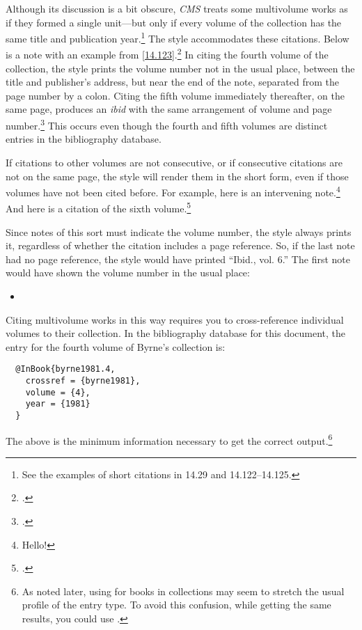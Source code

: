 \documentclass[11pt,letterpaper,oneside]{article}
\begin{document}
Although its discussion is a bit obscure, \textit{CMS} treats some
multivolume works as if they formed a single unit---but only if every
volume of the collection has the same title and publication
year.\footnote{See the examples of short citations in 14.29 and
14.122--14.125.} The style accommodates these citations. Below is a
note with an example from \ref{14.123}.\footcite[243]{byrne1981.4} In
citing the fourth volume of the collection, the style prints the
volume number not in the usual place, between the title and
publisher's address, but near the end of the note, separated from the
page number by a colon. Citing the fifth volume immediately
thereafter, on the same page, produces an \textit{ibid} with the same
arrangement of volume and page number.\footcite[91]{byrne1981.5} This
occurs even though the fourth and fifth volumes are distinct entries
in the bibliography database.

If citations to other volumes are not consecutive, or if consecutive
citations are not on the same page, the style will render them in the
short form, even if those volumes have not been cited before. For
example, here is an intervening note.\footnote{Hello!} And here is a
citation of the sixth volume.\footcite[23--32]{byrne1981.6}

Since notes of this sort must indicate the volume number, the style
always prints it, regardless of whether the citation includes a page
reference. So, if the last note had no page reference, the style would
have printed ``Ibid., vol. 6.'' The first note would have shown the
volume number in the usual place:

\begin{itemize}
\item[] 
\end{itemize}

Citing multivolume works in this way requires you to cross-reference
individual volumes to their collection. In the bibliography database
for this document, the entry for the fourth volume of Byrne's
collection is:

\begin{lstlisting}
  @InBook{byrne1981.4,
    crossref = {byrne1981},
    volume = {4},
    year = {1981}
  }
\end{lstlisting}

\noindent The above is the minimum information necessary to get the
correct output.\footnote{As noted later, using  for
books in collections may seem to stretch the usual profile of the
entry type. To avoid this confusion, while getting the same results,
you could use .}
\end{document}
